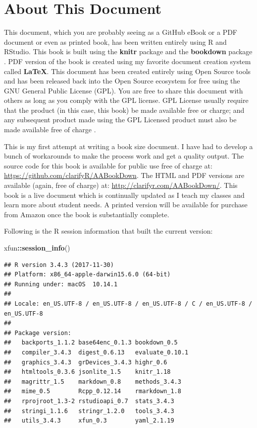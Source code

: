 \documentclass[]{krantz}
\makeatletter
\newenvironment{Shaded}{\begin{snugshade}}{\end{snugshade}}
\newcommand{\KeywordTok}[1]{\textcolor[rgb]{0.27,0.27,0.27}{\textbf{#1}}}
\newcommand{\OperatorTok}[1]{\textcolor[rgb]{0.81,0.36,0.00}{\textbf{#1}}}
\newcommand{\NormalTok}[1]{#1}
\newenvironment{kframe}{%
\medskip{}
\setlength{\fboxsep}{.8em}
 \def\at@end@of@kframe{}%
 \ifinner\ifhmode%
  \def\at@end@of@kframe{\end{minipage}}%
  \begin{minipage}{\columnwidth}%
 \fi\fi%
 \def\FrameCommand##1{\hskip\@totalleftmargin \hskip-\fboxsep
 \colorbox{shadecolor}{##1}\hskip-\fboxsep
     \hskip-\linewidth \hskip-\@totalleftmargin \hskip\columnwidth}%
 \MakeFramed {\advance\hsize-\width
   \@totalleftmargin\z@ \linewidth\hsize
   \@setminipage}}%
 {\par\unskip\endMakeFramed%
 \at@end@of@kframe}
\renewenvironment{Shaded}{\begin{kframe}}{\end{kframe}}
\theoremstyle{definition}
\theoremstyle{definition}
\theoremstyle{definition}
\theoremstyle{remark}
\makeatother
\begin{document}
\section*{About This Document}\label{about-this-document}


This document, which you are probably seeing as a GitHub eBook or a PDF
document or even as printed book, has been written entirely using R and
RStudio. This book is built using the \textbf{knitr}
package \citep{xie2015} and the \textbf{bookdown}
package \citep{R-bookdown}. PDF version of the book is created using my
favorite document creation system called \textbf{LaTeX}. This document
has been created entirely using Open Source tools and has been released
back into the Open Source ecosystem for free using the GNU General
Public License (GPL). You are free to share this document with others as
long as you comply with the GPL license. GPL License usually require
that the product (in this case, this book) be made available free or
charge; and any subsequent product made using the GPL Licensed product
must also be made available free of charge \citep{TheGNUGe51:online}.

This is my first attempt at writing a book size document. I have had to
develop a bunch of workarounds to make the process work and get a
quality output. The source code for this book is available for public
use free of charge at: \url{https://github.com/clarifyR/AABookDown}. The
HTML and PDF versions are available (again, free of charge) at:
\url{http://clarifyr.com/AABookDown/}. This book is a live document
which is continually updated as I teach my classes and learn more about
student needs. A printed version will be available for purchase from
Amazon once the book is substantially complete.

Following is the R session information that built the current version:

\begin{Shaded}
\begin{Highlighting}[]
\NormalTok{xfun}\OperatorTok{::}\KeywordTok{session_info}\NormalTok{()}
\end{Highlighting}
\end{Shaded}

\begin{verbatim}
## R version 3.4.3 (2017-11-30)
## Platform: x86_64-apple-darwin15.6.0 (64-bit)
## Running under: macOS  10.14.1
## 
## Locale: en_US.UTF-8 / en_US.UTF-8 / en_US.UTF-8 / C / en_US.UTF-8 / en_US.UTF-8
## 
## Package version:
##   backports_1.1.2 base64enc_0.1.3 bookdown_0.5   
##   compiler_3.4.3  digest_0.6.13   evaluate_0.10.1
##   graphics_3.4.3  grDevices_3.4.3 highr_0.6      
##   htmltools_0.3.6 jsonlite_1.5    knitr_1.18     
##   magrittr_1.5    markdown_0.8    methods_3.4.3  
##   mime_0.5        Rcpp_0.12.14    rmarkdown_1.8  
##   rprojroot_1.3-2 rstudioapi_0.7  stats_3.4.3    
##   stringi_1.1.6   stringr_1.2.0   tools_3.4.3    
##   utils_3.4.3     xfun_0.3        yaml_2.1.19
\end{verbatim}
\end{document}
